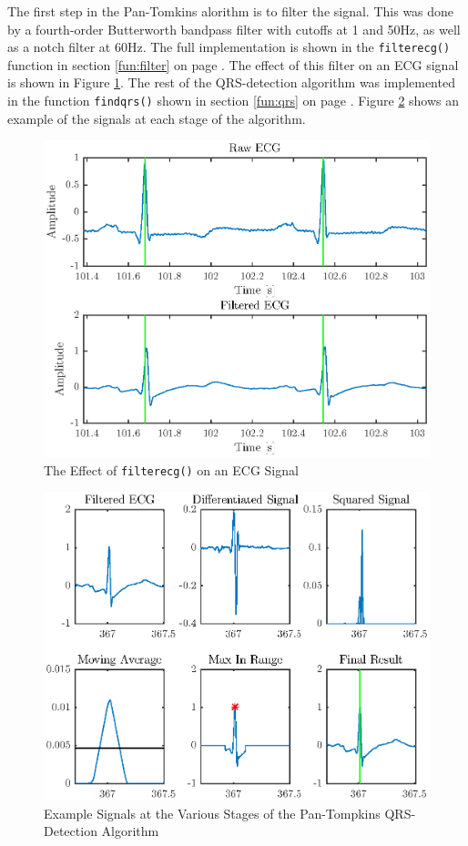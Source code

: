 \documentclass[12pt,letter]{article}
\newcommand{\rpref}[1]{\ref{#1} on page \pageref{#1}}
\begin{document}
The first step in the Pan-Tomkins alorithm is to filter the signal.  This was
done by a fourth-order Butterworth bandpass filter with cutoffs at 1 and 50Hz, 
as well as a notch filter at 60Hz.  The full implementation is shown in the
\verb`filterecg()` function in section \rpref{fun:filter}.  The effect of this
filter on an ECG signal is shown in Figure \ref{fig:filter}.  The rest of the
QRS-detection algorithm was implemented in the function \verb`findqrs()` shown
in section \rpref{fun:qrs}.  Figure \ref{fig:qrs} shows an example of the
signals at each stage of the algorithm.  

\begin{figure}[hbtp]
    \centering
    \includegraphics[height=0.44\textheight]{../figures/figures_02}
    \caption{The Effect of \texttt{filterecg()} on an ECG Signal}
    \label{fig:filter}
\end{figure}

\begin{figure}[hbtp]
    \centering
    \includegraphics[height=0.44\textheight]{../figures/figures_03}
    \caption{Example Signals at the Various Stages of the Pan-Tompkins
    QRS-Detection Algorithm}
    \label{fig:qrs}
\end{figure}
\end{document}

